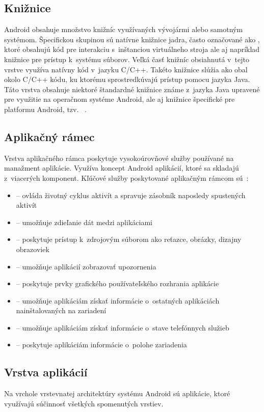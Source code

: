 \subsection{Knižnice}
Android obsahuje množstvo knižníc využívaných vývojármi alebo samotným systémom. Špecifickou skupinou sú natívne knižnice jadra, často označované ako , ktoré obsahujú kód pre interakciu s~inštanciou virtuálneho stroja ale aj napríklad knižnice pre prístup k~systému súborov. Veľká časť knižníc obsiahnutá v~tejto vrstve využíva natívny kód v~jazyku C/C++. Takéto knižnice slúžia ako obal okolo C/C++ kódu, ku ktorému  sprostredkúvajú prístup pomocu jazyka Java. Táto vrstva obsahuje niektoré štandardné knižnice známe z~jazyka Java upravené pre využitie na operačnom systéme Android, ale aj knižnice špecifické pre platformu Android, tzv. ~\cite{architecture}.
\subsection{Aplikačný rámec}
Vrstva aplikačného rámca poskytuje vysokoúrovňové služby používané na manažment aplikácie. Využíva koncept Android aplikácií, ktoré sa skladajú z~viacerých komponent. Kľúčové služby poskytované aplikačným rámcom sú~\cite{architecture}: 
\begin{itemize}
	\item {}  --  ovláda životný cyklus aktivít a spravuje zásobník naposledy spustených aktivít
	\item {}  --  umožňuje zdieľanie dát medzi aplikáciami
	\item {}  --  poskytuje prístup k~zdrojovým súborom ako reťazce, obrázky, dizajny obrazoviek
	\item {}  --  umožňuje aplikácií zobrazovať upozornenia
	\item {}  --  poskytuje prvky grafického používateľského rozhrania aplikácie
	\item {}  --  umožňuje aplikáciám získať informácie o~ostatných aplikáciách nainštalovaných na zariadení
	\item {}  --  umožňuje aplikáciám získať informácie o~stave telefónnych služieb
	\item {}  --  poskytuje aplikáciám informácie o~polohe zariadenia
\end{itemize}
\subsection{Vrstva aplikácií}
Na vrchole vrstevnatej architektúry systému Android sú aplikácie, ktoré využívajú súčinnosť všetkých spomenutých vrstiev. 

